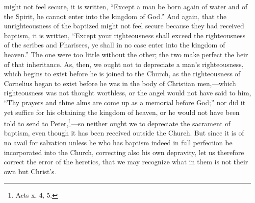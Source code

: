 might not feel secure, it is written, ``Except a man be born again of water and of the Spirit, he cannot enter into the kingdom of God.'' And again, that the unrighteousness of the baptized might not feel secure because they had received baptism, it is written, ``Except your righteousness shall exceed the righteousness of the scribes and Pharisees, ye shall in no case enter into the kingdom of heaven.'' The one were too little without the other; the two make perfect the heir of that inheritance. As, then, we ought not to depreciate a man’s righteousness, which begins to exist before he is joined to the Church, as the righteousness of Cornelius began to exist before he was in the body of Christian men,—which righteousness was not thought worthless, or the angel would not have said to him, ``Thy prayers and thine alms are come up as a memorial before God;'' nor did it yet suffice for his obtaining the kingdom of heaven, or he would not have been told to send to Peter,\footnote{\par  Acts x. 4, 5.}—so neither ought we to depreciate the sacrament of baptism, even though it has been received outside the Church. But since it is of no avail for salvation unless he who has baptism indeed in full perfection be incorporated into the Church, correcting also his own depravity, let us therefore correct the error of the heretics, that we may recognize what in them is not their own but Christ’s.


